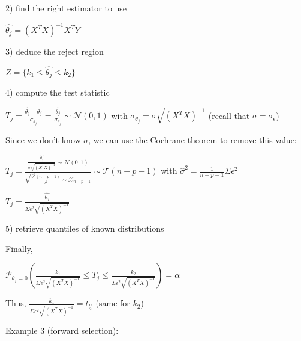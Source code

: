 \vspace{5mm}

2) find the right estimator to use

\vspace{5mm}

$\widehat{\theta_j} = (X^TX)^{-1}X^TY$

\vspace{5mm}

3) deduce the reject region

\vspace{5mm}

$Z=\{k_1 \leq \widehat{\theta_j} \leq k_2\}$

\vspace{5mm}

4) compute the test statistic

\vspace{5mm}

$T_j = \frac{\widehat{\theta_j}-\theta_j}{\sigma_{\theta_j}} = \frac{\widehat{\theta_j}}{\sigma_{\theta_j}}  \sim \mathcal{N}(0,1)$ with $\sigma_{\theta_j} = \sigma \sqrt{(X^TX)^{-1}}$ (recall that $\sigma = \sigma_{\epsilon}$)

\vspace{5mm}

Since we don't know $\sigma$, we can use the Cochrane theorem to remove this value:

$T_j = \frac{ \frac{\widehat{\theta_j}}{\sigma \sqrt{(X^TX)^{-1}}} \sim \mathcal{N}(0,1)}{\sqrt{\frac{\widehat{\sigma}^2 (n-p-1)}{\sigma^2} \sim \mathcal{X}_{n-p-1}}} \sim \mathcal{T}(n-p-1)$ with $\widehat{\sigma}^2 = \frac{1}{n-p-1} \Sigma \epsilon ^2$

$ T_j = \frac{\widehat{\theta_j}}{\Sigma \epsilon ^2 \sqrt{(X^TX)^{-1}}}$

\vspace{5mm}

5) retrieve quantiles of known distributions

\vspace{5mm}

Finally,


$\mathcal{P}_{\theta_j=0}(\frac{k_1}{\Sigma \epsilon ^2 \sqrt{(X^TX)^{-1}}} \leq T_j \leq \frac{k_2}{\Sigma \epsilon ^2 \sqrt{(X^TX)^{-1}}}) = \alpha$

Thus, $\frac{k_1}{\Sigma \epsilon ^2 \sqrt{(X^TX)^{-1}}} = t_{\frac{\alpha}{2}}$ (same for $k_2$)

\vspace{5mm}

Example 3 (forward selection):

